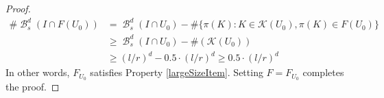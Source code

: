 \documentclass[dvipsnames,letterpaper,12pt]{article}
\numberwithin{equation}{section}
\theoremstyle{plain}
\theoremstyle{remark}
\DeclareMathOperator{\B}{\mathcal{B}}
\begin{document}
\begin{proof}
	\begin{align*}
		\# \B_s^d(I \cap F(U_0)) &= \B_s^d(I \cap U_0) - \# \{ \pi(K) : K \in \mathcal{K}(U_0), \pi(K) \in F(U_0) \}\\
		&\geq \B_s^d(I \cap U_0) - \#(\mathcal{K}(U_0))\\
		&\geq (l/r)^d - 0.5 \cdot (l/r)^d \geq 0.5 \cdot (l/r)^d
	\end{align*}  
	In other words, $F_{U_0}$ satisfies Property \ref{largeSizeItem}. Setting $F = F_{U_0}$ completes the proof.
\end{proof}
\end{document}
